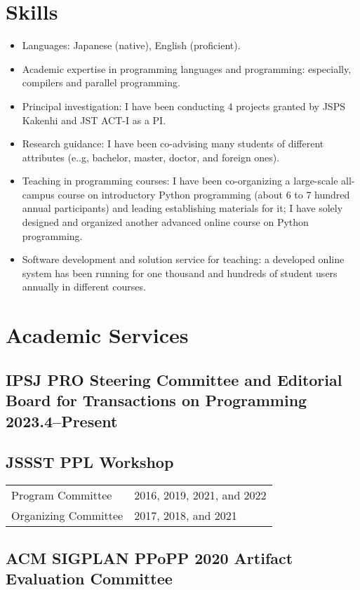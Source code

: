 \documentclass[a4paper,dvipdfmx]{article}
\newcommand{\datedsubsection}[2]{%
  \subsection[#1]{#1 \hfill #2}%
}
\begin{document}
\section{Skills}
\begin{itemize}
 \item Languages: Japanese (native), English (proficient).
 \item Academic expertise in programming languages and programming:
       especially, compilers and parallel programming.
 \item Principal investigation: I have been conducting 4 projects
       granted by JSPS Kakenhi and JST ACT-I as a PI.
 \item Research guidance: I have been co-advising many students of
       different attributes (e..g, bachelor, master, doctor, and foreign
       ones).
 \item Teaching in programming courses: I have been co-organizing a
       large-scale all-campus course on introductory Python programming
       (about 6 to 7 hundred annual participants) and leading
       establishing materials for it; I have solely designed and
       organized another advanced online course on Python programming.
 \item Software development and solution service for teaching: a
       developed online system has been running for one thousand and
       hundreds of student users annually in different courses.
\end{itemize}

\section{Academic Services}
\datedsubsection{IPSJ PRO Steering Committee and Editorial Board for Transactions on Programming}{2023.4--Present}
\subsection{JSSST PPL Workshop}
\begin{flushleft}
\begin{tabular}[t]{lp{12cm}}
Program Committee & 2016, 2019, 2021, and 2022 \\
Organizing Committee & 2017, 2018, and 2021 \\
\end{tabular}
\end{flushleft}
\subsection{ACM SIGPLAN PPoPP 2020 Artifact Evaluation Committee}
\end{document}
